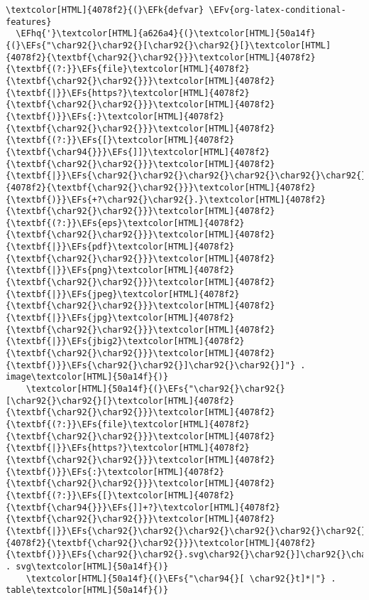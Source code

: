 \documentclass{scrartcl}
\newcommand{\EFk}[1]{\textcolor{EFk}{#1}} %
\newcommand{\EFs}[1]{\textcolor{EFs}{#1}} %
\newcommand{\EFv}[1]{\textcolor{EFv}{#1}} %
\newcommand{\EFhq}[1]{\textcolor{EFhq}{#1}} %
\begin{document}
\begin{enumerate}
\begin{Code}
\begin{Verbatim}[]
\textcolor[HTML]{4078f2}{(}\EFk{defvar} \EFv{org-latex-conditional-features}
  \EFhq{'}\textcolor[HTML]{a626a4}{(}\textcolor[HTML]{50a14f}{(}\EFs{"\char92{}\char92{}[\char92{}\char92{}[}\textcolor[HTML]{4078f2}{\textbf{\char92{}\char92{}}}\textcolor[HTML]{4078f2}{\textbf{(?:}}\EFs{file}\textcolor[HTML]{4078f2}{\textbf{\char92{}\char92{}}}\textcolor[HTML]{4078f2}{\textbf{|}}\EFs{https?}\textcolor[HTML]{4078f2}{\textbf{\char92{}\char92{}}}\textcolor[HTML]{4078f2}{\textbf{)}}\EFs{:}\textcolor[HTML]{4078f2}{\textbf{\char92{}\char92{}}}\textcolor[HTML]{4078f2}{\textbf{(?:}}\EFs{[}\textcolor[HTML]{4078f2}{\textbf{\char94{}}}\EFs{]]}\textcolor[HTML]{4078f2}{\textbf{\char92{}\char92{}}}\textcolor[HTML]{4078f2}{\textbf{|}}\EFs{\char92{}\char92{}\char92{}\char92{}\char92{}\char92{}]}\textcolor[HTML]{4078f2}{\textbf{\char92{}\char92{}}}\textcolor[HTML]{4078f2}{\textbf{)}}\EFs{+?\char92{}\char92{}.}\textcolor[HTML]{4078f2}{\textbf{\char92{}\char92{}}}\textcolor[HTML]{4078f2}{\textbf{(?:}}\EFs{eps}\textcolor[HTML]{4078f2}{\textbf{\char92{}\char92{}}}\textcolor[HTML]{4078f2}{\textbf{|}}\EFs{pdf}\textcolor[HTML]{4078f2}{\textbf{\char92{}\char92{}}}\textcolor[HTML]{4078f2}{\textbf{|}}\EFs{png}\textcolor[HTML]{4078f2}{\textbf{\char92{}\char92{}}}\textcolor[HTML]{4078f2}{\textbf{|}}\EFs{jpeg}\textcolor[HTML]{4078f2}{\textbf{\char92{}\char92{}}}\textcolor[HTML]{4078f2}{\textbf{|}}\EFs{jpg}\textcolor[HTML]{4078f2}{\textbf{\char92{}\char92{}}}\textcolor[HTML]{4078f2}{\textbf{|}}\EFs{jbig2}\textcolor[HTML]{4078f2}{\textbf{\char92{}\char92{}}}\textcolor[HTML]{4078f2}{\textbf{)}}\EFs{\char92{}\char92{}]\char92{}\char92{}]"} . image\textcolor[HTML]{50a14f}{)}
    \textcolor[HTML]{50a14f}{(}\EFs{"\char92{}\char92{}[\char92{}\char92{}[}\textcolor[HTML]{4078f2}{\textbf{\char92{}\char92{}}}\textcolor[HTML]{4078f2}{\textbf{(?:}}\EFs{file}\textcolor[HTML]{4078f2}{\textbf{\char92{}\char92{}}}\textcolor[HTML]{4078f2}{\textbf{|}}\EFs{https?}\textcolor[HTML]{4078f2}{\textbf{\char92{}\char92{}}}\textcolor[HTML]{4078f2}{\textbf{)}}\EFs{:}\textcolor[HTML]{4078f2}{\textbf{\char92{}\char92{}}}\textcolor[HTML]{4078f2}{\textbf{(?:}}\EFs{[}\textcolor[HTML]{4078f2}{\textbf{\char94{}}}\EFs{]]+?}\textcolor[HTML]{4078f2}{\textbf{\char92{}\char92{}}}\textcolor[HTML]{4078f2}{\textbf{|}}\EFs{\char92{}\char92{}\char92{}\char92{}\char92{}\char92{}]}\textcolor[HTML]{4078f2}{\textbf{\char92{}\char92{}}}\textcolor[HTML]{4078f2}{\textbf{)}}\EFs{\char92{}\char92{}.svg\char92{}\char92{}]\char92{}\char92{}]"} . svg\textcolor[HTML]{50a14f}{)}
    \textcolor[HTML]{50a14f}{(}\EFs{"\char94{}[ \char92{}t]*|"} . table\textcolor[HTML]{50a14f}{)}

\end{Verbatim}
\end{Code}
\end{enumerate}
\end{document}
